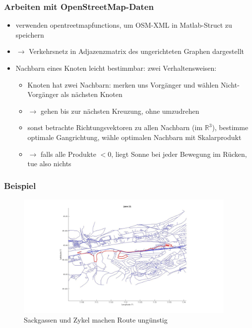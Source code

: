 \documentclass[aspectratio=43]{beamer}
\begin{document}
\begin{frame}
    \frametitle{Arbeiten mit OpenStreetMap-Daten}
    \begin{itemize}
        \item verwenden opentreetmapfunctions, um OSM-XML in Matlab-Struct zu speichern
        \item[]$\rightarrow$ Verkehrsnetz in Adjazenzmatrix des ungerichteten Graphen
            dargestellt
        \item Nachbarn eines Knoten leicht bestimmbar: zwei
            Verhaltensweisen:
            \begin{itemize}
                \item Knoten hat zwei Nachbarn: merken uns Vorgänger und wählen
                    Nicht-Vorgänger als nächsten Knoten
                \item[]$\rightarrow$ gehen bis zur nächsten Kreuzung, ohne umzudrehen
                \item sonst betrachte Richtungsvektoren zu allen Nachbarn (im $\mathbb
                    R^3$), bestimme optimale Gangrichtung, wähle optimalen Nachbarn mit
                    Skalarprodukt
                \item[]$\rightarrow$ falls alle Produkte $<0$, liegt Sonne bei jeder
                    Bewegung im Rücken, tue also nichts
            \end{itemize}
    \end{itemize}
\end{frame}

\begin{frame}
    \frametitle{Beispiel}
    \begin{figure}[t]
        \centering
        \includegraphics[width=0.95\textwidth]{bilder/klplot2.jpg}
        \caption{Sackgassen und Zykel machen Route ungünstig}
    \end{figure}
\end{frame}
\end{document}
